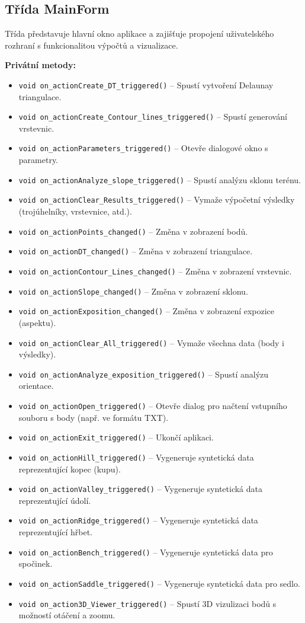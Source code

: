 \subsection{Třída MainForm}
Třída představuje hlavní okno aplikace a zajišťuje propojení uživatelského rozhraní s funkcionalitou výpočtů a vizualizace.

\textbf{Privátní metody:}
\begin{itemize}
\item \texttt{void on\_actionCreate\_DT\_triggered()} – Spustí vytvoření Delaunay triangulace.
\item \texttt{void on\_actionCreate\_Contour\_lines\_triggered()} – Spustí generování vrstevnic.
\item \texttt{void on\_actionParameters\_triggered()} – Otevře dialogové okno s parametry.
\item \texttt{void on\_actionAnalyze\_slope\_triggered()} – Spustí analýzu sklonu terénu.
\item \texttt{void on\_actionClear\_Results\_triggered()} – Vymaže výpočetní výsledky (trojúhelníky, vrstevnice, atd.).
\item \texttt{void on\_actionPoints\_changed()} – Změna v zobrazení bodů.
\item \texttt{void on\_actionDT\_changed()} – Změna v zobrazení triangulace.
\item \texttt{void on\_actionContour\_Lines\_changed()} – Změna v zobrazení vrstevnic.
\item \texttt{void on\_actionSlope\_changed()} – Změna v zobrazení sklonu.
\item \texttt{void on\_actionExposition\_changed()} – Změna v zobrazení expozice (aspektu).
\item \texttt{void on\_actionClear\_All\_triggered()} – Vymaže všechna data (body i výsledky).
\item \texttt{void on\_actionAnalyze\_exposition\_triggered()} – Spustí analýzu orientace.
\item \texttt{void on\_actionOpen\_triggered()} – Otevře dialog pro načtení vstupního souboru s body (např. ve formátu TXT).
\item \texttt{void on\_actionExit\_triggered()} – Ukončí aplikaci.
\item \texttt{void on\_actionHill\_triggered()} – Vygeneruje syntetická data reprezentující kopec (kupu).
\item \texttt{void on\_actionValley\_triggered()} – Vygeneruje syntetická data reprezentující údolí.
\item \texttt{void on\_actionRidge\_triggered()} – Vygeneruje syntetická data reprezentující hřbet.
\item \texttt{void on\_actionBench\_triggered()} – Vygeneruje syntetická data pro spočinek.
\item \texttt{void on\_actionSaddle\_triggered()} – Vygeneruje syntetická data pro sedlo.
\item \texttt{void on\_action3D\_Viewer\_triggered()} – Spustí 3D vizulizaci bodů s možností otáčení a zoomu.

\end{itemize}

